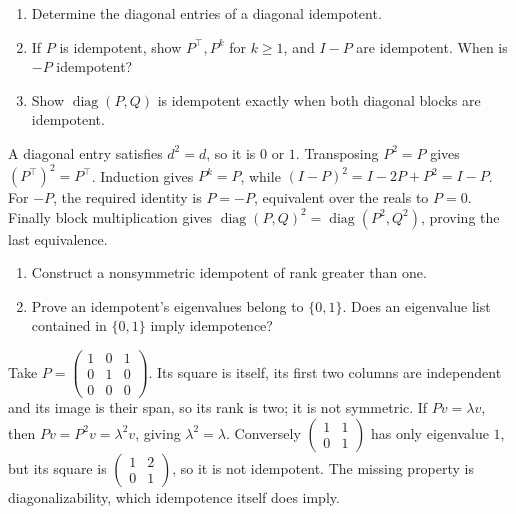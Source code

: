 \begin{problem}\label{ex:09:idempotent-basics}
\begin{enumerate}
\item Determine the diagonal entries of a diagonal idempotent.
\item If \(P\) is idempotent, show \(P^\top,P^k\) for \(k\geqslant1\),
and \(I-P\) are idempotent. When is \(-P\) idempotent?
\item Show \(\operatorname{diag}(P,Q)\) is idempotent exactly when both
diagonal blocks are idempotent.
\end{enumerate}
\end{problem}
\begin{solution}
A diagonal entry satisfies \(d^2=d\), so it is \(0\) or \(1\).
Transposing \(P^2=P\) gives \((P^\top)^2=P^\top\).
Induction gives \(P^k=P\), while
\((I-P)^2=I-2P+P^2=I-P\).
For \(-P\), the required identity is \(P=-P\), equivalent over the
reals to \(P=0\).
Finally block multiplication gives
\(\operatorname{diag}(P,Q)^2=\operatorname{diag}(P^2,Q^2)\),
proving the last equivalence.
\end{solution}

\begin{problem}\label{ex:09:idempotent-examples}
\leavevmode\par
\begin{enumerate}
\item Construct a nonsymmetric idempotent of rank greater than one.
\item Prove an idempotent's eigenvalues belong to \(\{0,1\}\).
Does an eigenvalue list contained in \(\{0,1\}\) imply idempotence?
\end{enumerate}
\end{problem}
\begin{solution}
Take \(P=\begin{pmatrix}1&0&1\\0&1&0\\0&0&0\end{pmatrix}\).
Its square is itself, its first two columns are independent and its
image is their span, so its rank is two; it is not symmetric.
If \(Pv=\lambda v\), then \(Pv=P^2v=\lambda^2v\), giving
\(\lambda^2=\lambda\).
Conversely \(\begin{pmatrix}1&1\\0&1\end{pmatrix}\) has only
eigenvalue \(1\), but its square is
\(\begin{pmatrix}1&2\\0&1\end{pmatrix}\), so it is not idempotent.
The missing property is diagonalizability, which idempotence itself
does imply.
\end{solution}

